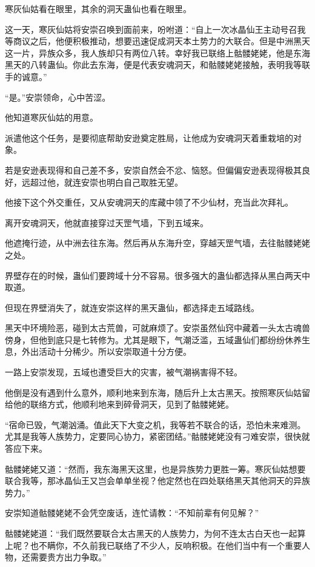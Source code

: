 \begin{this_body}
寒灰仙姑看在眼里，其余的洞天蛊仙也看在眼里。

这一天，寒灰仙姑将安崇召唤到面前来，吩咐道：“自上一次冰晶仙王主动号召我等商议之后，他便积极推动，想要迅速促成洞天本土势力的大联合。但是中洲黑天这一片，异族众多，我人族却只有两位八转。幸好我已联络上骷髅姥姥，他是东海黑天的八转蛊仙。你此去东海，便是代表安魂洞天，和骷髅姥姥接触，表明我等联手的诚意。”

“是。”安崇领命，心中苦涩。

他知道寒灰仙姑的用意。

派遣他这个任务，是要彻底帮助安逊奠定胜局，让他成为安魂洞天着重栽培的对象。

若是安逊表现得和自己差不多，安崇自然会不忿、恼怒。但偏偏安逊表现得极其良好，远超过他，就连安崇也明白自己取胜无望。

他接下这个外交重任，又从安魂洞天的库藏中领了不少仙材，充当此次拜礼。

离开安魂洞天，他就直接穿过天罡气墙，下到五域来。

他遮掩行迹，从中洲去往东海。然后再从东海升空，穿越天罡气墙，去往骷髅姥姥之处。

界壁存在的时候，蛊仙们要跨域十分不容易。很多强大的蛊仙都选择从黑白两天中取道。

但现在界壁消失了，就连安崇这样的黑天蛊仙，都选择走五域路线。

黑天中环境险恶，碰到太古荒兽，可就麻烦了。安崇虽然仙窍中藏着一头太古魂兽傍身，但他到底只是七转修为。尤其是眼下，气潮泛滥，五域蛊仙们都纷纷休养生息，外出活动十分稀少。所以安崇取道十分方便。

一路上安崇发现，五域也遭受巨大的灾害，被气潮祸害得不轻。

他倒是没有遇到什么意外，顺利地来到东海，随后升上太古黑天。按照寒灰仙姑留给他的联络方式，他顺利地来到碎骨洞天，见到了骷髅姥姥。

“宿命已毁，气潮汹涌。值此天下大变之机，我等若不联合的话，恐怕未来难测。尤其是我等人族势力，定要同心协力，紧密团结。”骷髅姥姥没有刁难安崇，很快就答应下来。

骷髅姥姥又道：“然而，我东海黑天这里，也是异族势力更胜一筹。寒灰仙姑想要联合我等，那冰晶仙王又岂会单单坐视？他定然也在四处联络黑天其他洞天的异族势力。”

安崇知道骷髅姥姥不会凭空废话，连忙请教：“不知前辈有何见解？”

骷髅姥姥道：“我们既然要联合太古黑天的人族势力，为何不连太古白天也一起算上呢？也不瞒你，不久前我已联络了不少人，反响积极。在他们当中有一个重要人物，还需要贵方出力争取。”


\end{this_body}
